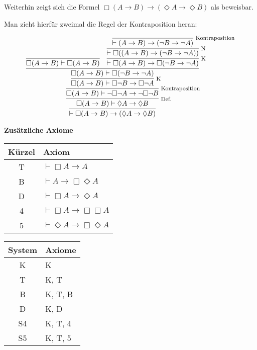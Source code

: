 \documentclass[8pt]{beamer}
\newcommand{\strong}[1]{\textsf{\textbf{#1}}}
\newcommand{\infernote}[1]{\!\text{\footnotesize #1}}
\newcommand{\centerheadline}[1]{%
  \begin{center}\strong{#1}\end{center}}
\newcommand{\parspace}{\vspace{0.8em}}
\newcommand{\cond}{\rightarrow}
\newcommand{\lnec}{\Box}
\newcommand{\lpos}{\Diamond}
\begin{document}
\begin{frame}
Weiterhin zeigt sich die Formel $\lnec (A\cond B)\cond (\lpos A\cond\lpos B)$
als beweisbar.

\parspace
Man zieht hierfür zweimal die Regel der Kontraposition heran:\pause

\vspace{1em}
\[
\infer{\vdash\lnec (A\cond B)\cond (\lpos A\cond\lpos B)}{
  \infer[\infernote{Def.}]{\lnec (A\cond B)\vdash\lpos A\cond\lpos B}{
    \infer[\infernote{Kontraposition}]{\lnec (A\cond B)\vdash\neg\lnec\neg A\cond\neg\lnec\neg B}{
      \infer[\infernote{K}]{\lnec (A\cond B)\vdash\lnec\neg B\cond\lnec\neg A}{
        \infer{\lnec (A\cond B)\vdash\lnec (\neg B\cond\neg A)}{
          \infer{\lnec (A\cond B)\vdash\lnec (A\cond B)}{}
        & \infer[\infernote{K}]{\vdash\lnec (A\cond B)\cond\lnec (\neg B\cond\neg A)}{
            \infer[\infernote{N}]{\vdash\lnec ((A\cond B)\cond(\neg B\cond\neg A))}{
              \infer[\infernote{Kontraposition}]{\vdash (A\cond B)\cond (\neg B\cond\neg A)}{}}}}}}}}
\]
\end{frame}

\begin{frame}
\centerheadline{Zusätzliche Axiome}
\end{frame}

\begin{frame}
\begin{center}
\begin{tabular}{cl}
\toprule
\strong{Kürzel} & \strong{Axiom}\\
\midrule[\heavyrulewidth]
T & $\vdash\lnec A\cond A$\\
B & $\vdash A\cond\lnec\lpos A$\\
D & $\vdash\lnec A\cond\lpos A$\\
4 & $\vdash\lnec A\cond\lnec\lnec A$\\
5 & $\vdash\lpos A\cond\lnec\lpos A$\\
\bottomrule
\end{tabular}
\end{center}

\begin{center}
\begin{tabular}{cl}
\toprule
\strong{System} & \strong{Axiome}\\
\midrule[\heavyrulewidth]
K & K\\
T & K, T\\
B & K, T, B\\
D & K, D\\
S4 & K, T, 4\\
S5 & K, T, 5\\
\bottomrule
\end{tabular}
\end{center}
\end{frame}
\end{document}
